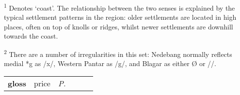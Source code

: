 \textsuperscript{1} Denotes `coast'. The relationship between the two senses is explained by the typical settlement patterns in the region: older settlements are located in high places, often on top of knolls or ridges, whilst newer settlements are downhill towards the coast.


\textsuperscript{2} There are a number of irregularities in this set: Nedebang normally reflects medial *g as /x/, Western Pantar as /g{\textlengthmark}/, and Blagar as either {\O} or /{\textglotstop}/.




\noindent
\begin{tabular*}{\textwidth}{@{\extracolsep{\fill}}llllll}
\mytoprule


{\bfseries gloss} & price & {\itshape P.} 


\end{tabular*}
